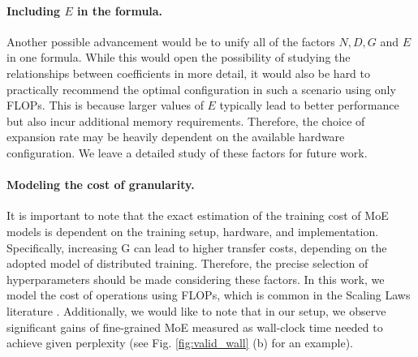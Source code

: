 \paragraph{Including $E$ in the formula.} Another possible advancement would be to unify all of the factors $N, D, G$ and $E$ in one formula. While this would open the possibility of studying the relationships between coefficients in more detail, it would also be hard to practically recommend the optimal configuration in such a scenario using only FLOPs. This is because larger values of $E$ typically lead to better performance but also incur additional memory requirements. Therefore, the choice of expansion rate may be heavily dependent on the available hardware configuration. We leave a detailed study of these factors for future work.


\paragraph{Modeling the cost of granularity.}
It is important to note that the exact estimation of the training cost of MoE models is dependent on the training setup, hardware, and implementation. Specifically, increasing G can lead to higher transfer costs, depending on the adopted model of distributed training. Therefore, the precise selection of hyperparameters should be made considering these factors. In this work, we model the cost of operations using FLOPs, which is common in the Scaling Laws literature \citep{kaplan2020scaling, hoffmann2022training, frantar2023scaling}. Additionally, we would like to note that in our setup, we observe significant gains of fine-grained MoE measured as wall-clock time needed to achieve given perplexity (see Fig. \ref{fig:valid_wall} (b) for an example).  


